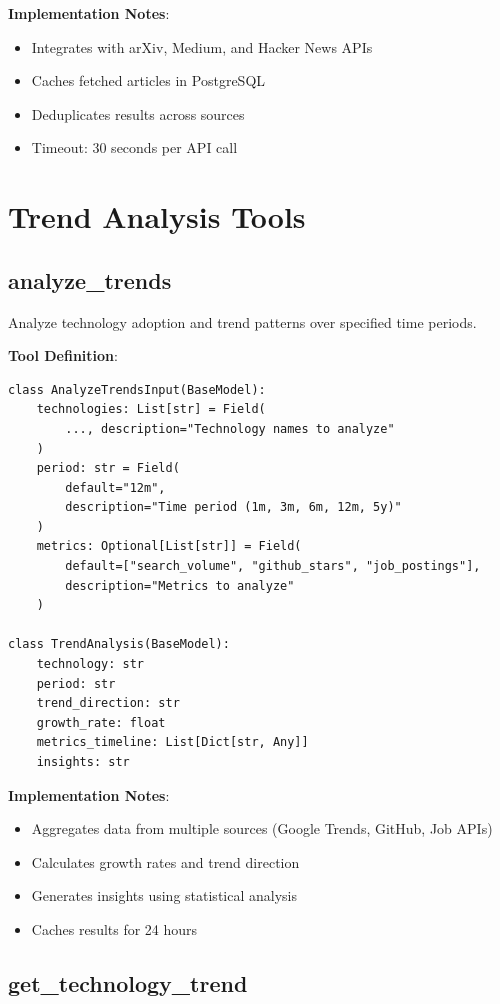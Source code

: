 \documentclass{report}
\begin{document}
\textbf{Implementation Notes}:
\begin{itemize}
    \item Integrates with arXiv, Medium, and Hacker News APIs
    \item Caches fetched articles in PostgreSQL
    \item Deduplicates results across sources
    \item Timeout: 30 seconds per API call
\end{itemize}

\section{Trend Analysis Tools}

\subsection{analyze\_trends}

Analyze technology adoption and trend patterns over specified time periods.

\textbf{Tool Definition}:
\begin{lstlisting}
class AnalyzeTrendsInput(BaseModel):
    technologies: List[str] = Field(
        ..., description="Technology names to analyze"
    )
    period: str = Field(
        default="12m",
        description="Time period (1m, 3m, 6m, 12m, 5y)"
    )
    metrics: Optional[List[str]] = Field(
        default=["search_volume", "github_stars", "job_postings"],
        description="Metrics to analyze"
    )

class TrendAnalysis(BaseModel):
    technology: str
    period: str
    trend_direction: str
    growth_rate: float
    metrics_timeline: List[Dict[str, Any]]
    insights: str
\end{lstlisting}

\textbf{Implementation Notes}:
\begin{itemize}
    \item Aggregates data from multiple sources (Google Trends, GitHub, Job APIs)
    \item Calculates growth rates and trend direction
    \item Generates insights using statistical analysis
    \item Caches results for 24 hours
\end{itemize}

\subsection{get\_technology\_trend}
\end{document}
